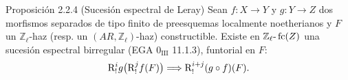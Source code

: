 \begin{statement}{Proposición 2.2.4 (Sucesión espectral de Leray)}
Sean \(f:X\to Y\) y \(g:Y\to Z\) dos morfismos separados de tipo finito de preesquemas localmente noetherianos y \(F\) un \(\mathbb Z_\ell\)-haz (resp. un \((AR,\mathbb Z_\ell)\)-haz) constructible. Existe en \(\mathbb Z_\ell\text{-}\operatorname{fc}(Z)\) una sucesión espectral birregular (EGA \(0_{\mathrm{III}}\) 11.1.3), funtorial en \(F\):
\[
\mathrm{R}^i_!g\bigl(\mathrm{R}^j_!f(F)\bigr)\Longrightarrow \mathrm{R}^{i+j}_!(g\circ f)(F).
\]
\end{statement}

